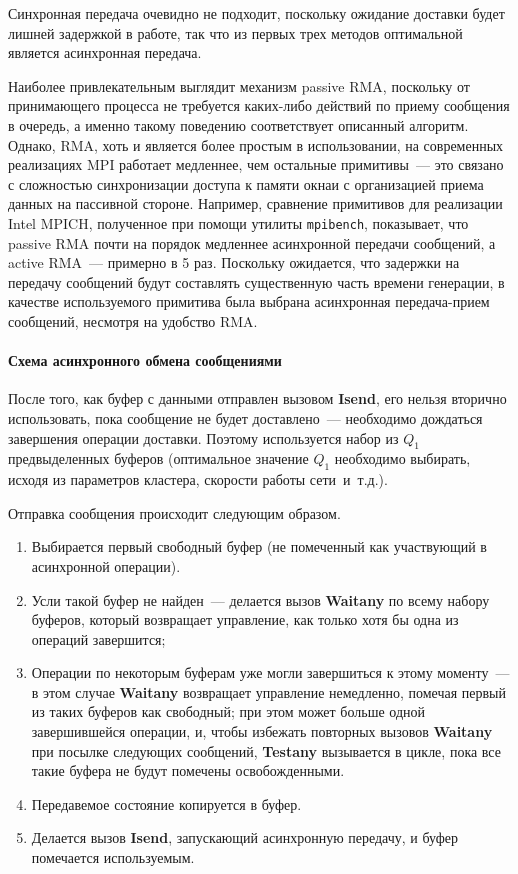\documentclass[12pt,a4paper,fleqn]{article}
\newcommand{\Code}[1]{\textbf{\mbox{#1}}}
\newcommand\etc{~и~т.д.}
\begin{document}
Синхронная передача очевидно не подходит, поскольку ожидание доставки будет лишней
задержкой в работе, так что из первых трех методов оптимальной является асинхронная
передача.

Наиболее привлекательным выглядит механизм passive RMA, поскольку от принимающего процесса не
требуется каких-либо действий по приему сообщения в очередь, а именно такому поведению соответствует
описанный алгоритм. Однако, RMA, хоть и является более простым в использовании, на современных
реализациях MPI работает медленнее, чем остальные примитивы~--- это связано с сложностью
синхронизации доступа к памяти окнаи с организацией приема данных на пассивной стороне. Например,
сравнение примитивов для реализации Intel MPICH, полученное при помощи утилиты \texttt{mpibench},
показывает, что passive RMA почти на порядок медленнее асинхронной передачи сообщений, а active
RMA~--- примерно в 5 раз. Поскольку ожидается, что задержки на передачу сообщений будут составлять
существенную часть времени генерации, в качестве используемого примитива была выбрана асинхронная
передача-прием сообщений, несмотря на удобство RMA.

\paragraph{Схема асинхронного обмена сообщениями}

После того, как буфер с данными отправлен вызовом \Code{Isend}, его нельзя вторично
использовать, пока сообщение не будет доставлено~--- необходимо дождаться завершения
операции доставки. Поэтому используется набор из $Q_1$ предвыделенных буферов (оптимальное
значение $Q_1$ необходимо выбирать, исходя из параметров кластера, скорости работы
сети\etc).

Отправка сообщения происходит следующим образом.
\begin{enumerate}
\item Выбирается первый свободный буфер (не помеченный как участвующий в асинхронной
  операции).
\item Усли такой буфер не найден~--- делается вызов \Code{Waitany} по всему набору
  буферов, который возвращает управление, как только хотя бы одна из операций завершится;
\item Операции по некоторым буферам уже могли завершиться к этому моменту~--- в этом
  случае \Code{Waitany} возвращает управление немедленно, помечая первый из таких буферов
  как свободный; при этом может больше одной завершившейся операции, и, чтобы избежать
  повторных вызовов \Code{Waitany} при посылке следующих сообщений, \Code{Testany}
  вызывается в цикле, пока все такие буфера не будут помечены освобожденными.
\item Передавемое состояние копируется в буфер.
\item Делается вызов \Code{Isend}, запускающий асинхронную передачу, и буфер помечается
  используемым.
\end{enumerate}
\end{document}
